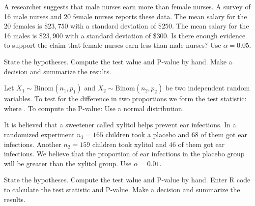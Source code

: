 \bb[resume]
\ii A researcher suggests that male nurses earn more than female nurses. A survey of 16 male nurses and 20 female nurses reports these data. The mean salary for the 20  females is \$$23,\!750$ with a standard deviation of \$$250$.  The mean salary for the 16  males is \$$23,\!900$ with a standard deviation of \$$300$. Is there enough evidence to support the claim that female nurses earn less than male nurses? Use $\alpha=0.05$.

\medskip

\bb
\ii State the hypotheses. \vspace{0.6in}
\ii Compute the test value and P-value by hand. \vfill
\ii Make a decision and summarize the results.\vspace{1.5in}
\ee
\ee

\clearpage
{}


\bbox
Let $X_1 \sim \mbox{Binom}(n_1, p_1)$ and $X_2 \sim \mbox{Binom}(n_2, p_2)$ be two independent random variables. To test for the difference in two proportions we form the test statistic:
where \textbf{}.
To compute the P-value:
\bi
\ii Use a normal distribution.
\ii \textbf{}
\ei
\ebox

 \bb[resume]
 \ii It is believed that a sweetener called xylitol helps prevent ear infections. In a randomized experiment $n_1 = 165$ children took a placebo and $68$ of them got ear infections. Another $n_2 = 159$ children took xylitol and $46$ of them got ear infections. We believe that the proportion of ear infections in the placebo group will be greater than the xylitol group. Use $\alpha=0 .01$.

\bb
\ii State the hypotheses. \vspace{0.6in}
\ii Compute the test value and P-value by hand. \vfill
\ii Enter R code to calculate the test statistic and P-value.\vspace{0.6in}
\ii Make a decision and summarize the results. \vspace{1.5in}
\ee
\ee


